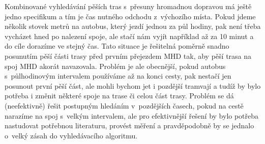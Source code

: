 Kombinované vyhledávání pěších tras s~přesuny hromadnou dopravou má ještě jedno
specifikum a tím je čas nutného odchodu z~výchozího místa. Pokud jdeme několik
stovek metrů na autobus, který jezdí jednou za půl hodiny, pak není třeba
vycházet hned po nalezení spoje, ale stačí nám vyjít například až za 10 minut a
do cíle dorazíme ve stejný čas. Tato situace je řešitelná poměrně snadno
posunutím pěší části trasy před prvním přejezdem MHD tak, aby pěší trasa na spoj
MHD akorát navazovala. Problém je ale obecnější, pokud autobus s~půlhodinovým
intervalem používáme až na konci cesty, pak nestačí jen posunout první pěší
část, ale mohli bychom jet i pozdější tramvají a tudíž by bylo potřeba i změnit
některé spoje na trase či celou část trasy. Problém se dá (neefektivně) řešit
postupným hledáním v~pozdějších časech, pokud na cestě narazíme na spoj
s~velkým intervalem, ale pro efektivnější řešení by bylo potřeba nastudovat
potřebnou literaturu, provést měření a pravděpodobně by se jednalo o~velký zásah
do vyhledávacího algoritmu.
